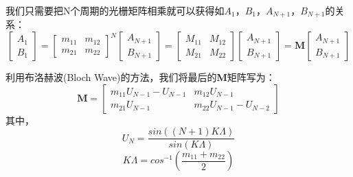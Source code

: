 我们只需要把N个周期的光栅矩阵相乘就可以获得如$A_1$，$B_1$，$A_{N+1}$，$B_{N+1}$的关系：
\begin{equation}
\label{Equ:ring_TMM_multi}
\begin{bmatrix}
A_{1}\\
B_{1}
\end{bmatrix} 
=
\begin{bmatrix}
m_{11} & m_{12}\\
m_{21} & m_{22}
\end{bmatrix}^N
\begin{bmatrix}
A_{N+1}\\
B_{N+1}
\end{bmatrix}
=
\begin{bmatrix}
M_{11} & M_{12}\\
M_{21} & M_{22}
\end{bmatrix}
\begin{bmatrix}
A_{N+1}\\
B_{N+1}
\end{bmatrix}
=
\textbf{M}
\begin{bmatrix}
A_{N+1}\\
B_{N+1}
\end{bmatrix}
\end{equation}

利用布洛赫波(Bloch Wave)的方法\cite{yariv2006photonics}，我们将最后的\textbf{M}矩阵写为：
\begin{equation}
\label{Equ:ring_bloch}
\textbf{M}
=
\begin{bmatrix}
m_{11}U_{N-1} - U_{N-1}& m_{12}U_{N-1}\\
m_{21}U_{N-1} & m_{22}U_{N-1}-U_{N-2}
\end{bmatrix}
\end{equation}
其中，
\begin{equation}
\label{Equ:UN}
U_N = \frac{sin((N+1)K\Lambda)}{sin(K\Lambda)}
\end{equation}
\begin{equation}
\label{Equ:KLambda}
K\Lambda = cos^{-1}\left(\frac{m_{11}+m_{22}}{2}\right)
\end{equation}

